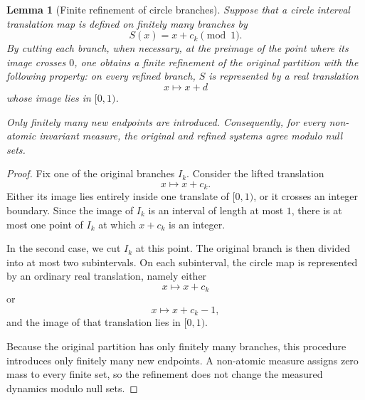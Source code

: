 \documentclass[11pt]{amsart}
\theoremstyle{plain}
\newtheorem{lemma}[theorem]{Lemma}
\theoremstyle{definition}
\theoremstyle{remark}
\begin{document}
\begin{lemma}[Finite refinement of circle branches]
	\label{lem:circle-refinement}
	Suppose that a circle interval translation map is defined on finitely many
	branches by
	\[
	S(x)=x+c_k\pmod 1.
	\]
	By cutting each branch, when necessary, at the preimage of the point where
	its image crosses \(0\), one obtains a finite refinement of the original
	partition with the following property: on every refined branch, \(S\) is
	represented by a real translation
	\[
	x\longmapsto x+d
	\]
	whose image lies in \([0,1)\).
	
	Only finitely many new endpoints are introduced. Consequently, for every
	non-atomic invariant measure, the original and refined systems agree modulo
	null sets.
\end{lemma}

\begin{proof}
	Fix one of the original branches \(I_k\). Consider the lifted translation
	\[
	x\longmapsto x+c_k.
	\]
	Either its image lies entirely inside one translate of \([0,1)\), or it
	crosses an integer boundary. Since the image of \(I_k\) is an interval of
	length at most \(1\), there is at most one point of \(I_k\) at which
	\(x+c_k\) is an integer.
	
	In the second case, we cut \(I_k\) at this point. The original branch is then
	divided into at most two subintervals. On each subinterval, the circle map is
	represented by an ordinary real translation, namely either
	\[
	x\longmapsto x+c_k
	\]
	or
	\[
	x\longmapsto x+c_k-1,
	\]
	and the image of that translation lies in \([0,1)\).
	
	Because the original partition has only finitely many branches, this
	procedure introduces only finitely many new endpoints. A non-atomic measure
	assigns zero mass to every finite set, so the refinement does not change the
	measured dynamics modulo null sets.
\end{proof}
\end{document}
